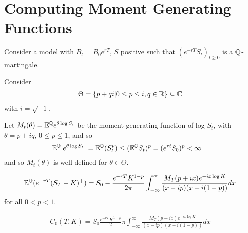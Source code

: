 \section{Computing Moment Generating Functions}
\label{sec:comp-moment-gener}

Consider a model with $B_{t} = B_{0} e^{rT}$, $S$ positive such that
$(e^{-rT}S_{t})_{t \geq 0}$ is a $\Q$-martingale.

Consider
\begin{align}
  \label{eq:115}
  \Theta = \{ p + qi | 0 \leq p \leq i, q \in \mathbb{R} \} \subseteq \mathbb{C}
\end{align} with $i = \sqrt{-1}$.

Let $M_{t}(\theta) = \mathbb{E}^{\Q} e^{\theta \log S_{t}}$ be the
moment generating function of log $S_{t}$, with $\theta = p + iq$, $0
\leq p \leq 1$, and so
\begin{align}
  \label{eq:116}
  \mathbb{E}^{\Q}|e^{\theta \log S_{t}}| &= \mathbb{E}^{\Q}(S_{t}^{p})
  \leq (\mathbb{E}^{\Q}S_{t})^{p} = (e^{rt} S_{0})^{p} < \infty
\end{align} and so $M_{t}(\theta)$ is well defined for $\theta \in
\Theta$.

\begin{thm}
  \label{defn:market_models:4}
  \begin{align}
    \label{eq:117}
    \mathbb{E}^{\Q}(e^{-rT}(S_{T} - K)^{+}) = S_{0} - \frac{e^{-rT}
      K^{1 - p}}{2 \pi} \int_{-\infty}^{\infty} \frac{M_{T}(p + ix)
      e^{-ix \log K}}{(x - ip)(x + i(1-p))} dx
  \end{align}
  for all $0 < p < 1$.
\end{thm}

\begin{thm}
  \label{defn:market_models:6}
  \begin{align}
    \label{eq:114}
    C_{0}(T, K) = S_{0}\frac{e^{-rT}K^{1-p}}2 \pi
  \int_{-\infty}^{\infty} \frac{M_{T}(p + ix) e^{-ix \log K}}{(x -
    ip)(x + i(1-p))} dx
  \end{align}
\end{thm}

